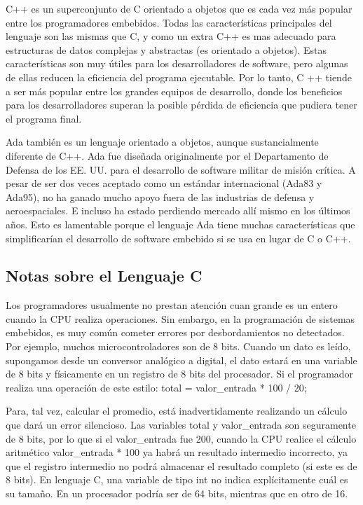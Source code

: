 \documentclass[output=paper, 
colorlinks,
citecolor=brown,
newtxmath
]{langscibook}
\begin{document}
C++ es un superconjunto de C orientado a objetos que es cada vez más popular entre los programadores embebidos. 
Todas las características principales del lenguaje son las mismas que C, y como un extra
C++ es mas adecuado para estructuras de datos complejas y abstractas (es orientado a objetos).
Estas características son muy útiles para los desarrolladores de software, pero 
algunas de ellas reducen la eficiencia del programa ejecutable. 
Por lo tanto, C ++ tiende a ser más popular entre los grandes equipos de 
desarrollo, donde los beneficios para los desarrolladores superan la posible
pérdida de eficiencia que pudiera tener el programa final.

Ada también es un lenguaje orientado a objetos, aunque sustancialmente diferente de C++. 
Ada fue diseñada originalmente por el Departamento de Defensa de los EE. UU. para 
el desarrollo de software militar de misión crítica.  
A pesar de ser dos veces aceptado como un estándar internacional (Ada83 y Ada95), 
no ha ganado mucho apoyo fuera de las industrias de defensa y aeroespaciales. 
E incluso ha estado perdiendo mercado allí mismo en los últimos años. 
Esto es lamentable porque el lenguaje Ada tiene muchas características 
que simplificarían el desarrollo de software embebido si se usa en lugar de C o C++.














\subsection {Notas sobre el Lenguaje C}



Los programadores usualmente no prestan atención cuan grande
es un entero cuando la CPU realiza operaciones.
Sin embargo, en la programación de sistemas embebidos,
es muy común cometer errores por desbordamientos no
detectados. Por ejemplo, muchos microcontroladores son de 8 bits.
Cuando un dato es leído, supongamos desde un conversor analógico a 
digital, el dato estará en una variable de 8 bits y físicamente
en un registro de 8 bits del procesador.
Si el programador realiza una operación de este estilo:
total = valor\_entrada * 100 / 20;

Para, tal vez, calcular el promedio, está inadvertidamente
realizando un cálculo que dará un error silencioso.
Las variables total y valor\_entrada son seguramente de 8 bits,
por lo que si el valor\_entrada fue 200, cuando la CPU 
realice el cálculo aritmético valor\_entrada * 100 ya habrá
un resultado intermedio incorrecto, ya que el registro
intermedio no podrá almacenar el resultado completo (si este es de 8 bits).
En lenguaje C, una variable de tipo int no indica explícitamente 
cuál es su tamaño. En un procesador podría ser de 64 bits, mientras
que en otro de 16.
\end{document}
